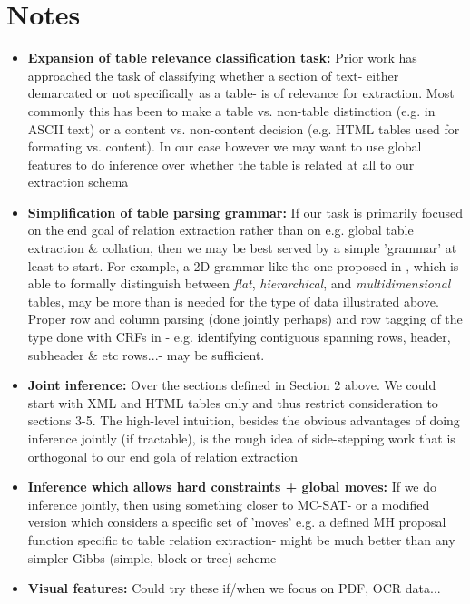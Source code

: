 \documentclass[11pt]{article} %
\begin{document}
\section{Notes}
\begin{itemize}
  \item \textbf{Expansion of table relevance classification task:} Prior work has approached the task of classifying whether a section of text- either demarcated or not specifically as a table- is of relevance for extraction.  Most commonly this has been to make a table vs. non-table distinction (e.g. in ASCII text) or a content vs. non-content decision (e.g. HTML tables used for formating vs. content).  In our case however we may want to use global features to do inference over whether the table is related at all to our extraction schema
  \item \textbf{Simplification of table parsing grammar:} If our task is primarily focused on the end goal of relation extraction rather than on e.g. global table extraction \& collation, then we may be best served by a simple 'grammar' at least to start.  For example, a 2D grammar like the one proposed in \cite{Lee_2006}, which is able to formally distinguish between \textit{flat}, \textit{hierarchical}, and \textit{multidimensional} tables, may be more than is needed for the type of data illustrated above.  Proper row and column parsing (done jointly perhaps) and row tagging of the type done with CRFs in \cite{McCallum_2003}- e.g. identifying contiguous spanning rows, header, subheader \& etc rows...- may be sufficient.
  \item \textbf{Joint inference:} Over the sections defined in Section 2 above.  We could start with XML and HTML tables only and thus restrict consideration to sections 3-5.  The high-level intuition, besides the obvious advantages of doing inference jointly (if tractable), is the rough idea of side-stepping work that is orthogonal to our end gola of relation extraction
  \item \textbf{Inference which allows hard constraints + global moves:} If we do inference jointly, then using something closer to MC-SAT- or a modified version which considers a specific set of 'moves' e.g. a defined MH proposal function specific to table relation extraction- might be much better than any simpler Gibbs (simple, block or tree) scheme
  \item \textbf{Visual features:} Could try these if/when we focus on PDF, OCR data...
\end{itemize}
\end{document}
